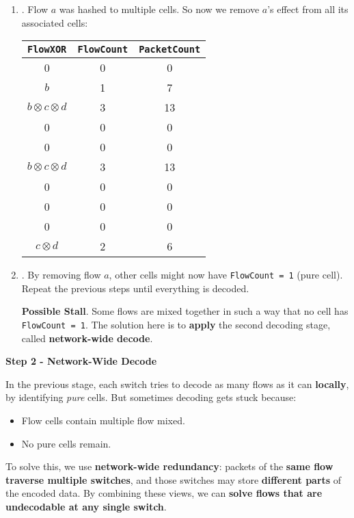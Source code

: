 \begin{enumerate}
    \item {}. Flow $a$ was hashed to multiple cells. So now we remove $a$'s effect from all its associated cells:
    \begin{table}[!htp]
        \centering
        \begin{tabular}{@{} c | c | c @{}}
            \toprule
            \texttt{FlowXOR} & \texttt{FlowCount} & \texttt{PacketCount} \\
            \midrule
            0 & 0 & 0 \\
            $b$ & 1 & 7 \\
            $b \otimes c \otimes d$ & 3 & 13 \\
            0 & 0 & 0 \\
            0 & 0 & 0 \\
            $b \otimes c \otimes d$ & 3 & 13 \\
            0 & 0 & 0 \\
            0 & 0 & 0 \\
            0 & 0 & 0 \\
            $c \otimes d$ & 2 & 6 \\
            \bottomrule
        \end{tabular}
    \end{table}

    
    \item {}. By removing flow $a$, other cells might now have \texttt{FlowCount = 1} (pure cell). Repeat the previous steps until everything is decoded.

    \textcolor{Red2}{ \textbf{Possible Stall}}. Some flows are mixed together in such a way that no cell has \texttt{FlowCount = 1}. The solution here is to \textbf{apply} the second decoding stage, called \textbf{network-wide decode}.
\end{enumerate}

\highspace
\begin{flushleft}
    \textcolor{Green3}{ \textbf{Step 2 - Network-Wide Decode}}
\end{flushleft}
In the previous stage, each switch tries to decode as many flows as it can \textbf{locally}, by identifying \emph{pure} cells. But sometimes decoding gets stuck because:
\begin{itemize}
    \item Flow cells contain multiple flow mixed.
    \item No pure cells remain.
\end{itemize}
To solve this, we use \textbf{network-wide redundancy}: packets of the \textbf{same flow traverse multiple switches}, and those switches may store \textbf{different parts} of the encoded data. By combining these views, we can \textbf{solve flows that are undecodable at any single switch}.

